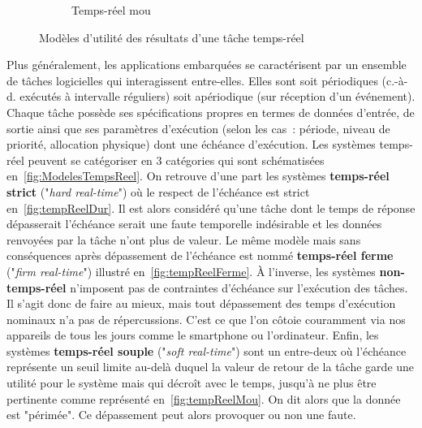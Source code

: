 \documentclass[french, a4paper, 11pt, twoside, pdftex]{StyleThese}
\begin{document}
\begin{figure}[h]
\begin{subfigure}{.3\textwidth}
				\caption[]{Temps-réel mou}
				\label{fig:tempReelMou}
			\end{subfigure}
			\caption{Modèles d'utilité des résultats d'une tâche temps-réel}
			\label{fig:ModelesTempsReel}
		\end{figure}
		
		Plus généralement, les applications embarquées se caractérisent par un ensemble de tâches logicielles qui interagissent entre-elles. Elles sont soit périodiques (c.-à-d. exécutés à intervalle réguliers) soit apériodique (sur réception d'un événement). Chaque tâche possède ses spécifications propres en termes de données d'entrée, de sortie ainsi que ses paramètres d'exécution (selon les cas : période, niveau de priorité, allocation physique) dont une échéance d'exécution. Les systèmes temps-réel peuvent se catégoriser en 3 catégories qui sont schématisées en~\autoref{fig:ModelesTempsReel}. On retrouve d'une part les systèmes \textbf{temps-réel strict} ("\textit{hard real-time}") où le respect de l'échéance est strict en~\autoref{fig:tempReelDur}. Il est alors considéré qu'une tâche dont le temps de réponse dépasserait l'échéance serait une faute temporelle indésirable et les données renvoyées par la tâche n'ont plus de valeur. Le même modèle mais sans conséquences après dépassement de l'échéance est nommé \textbf{temps-réel ferme} ("\textit{firm real-time}") illustré en~\autoref{fig:tempReelFerme}. À l'inverse, les systèmes \textbf{non-temps-réel} n'imposent pas de contraintes d'échéance sur l'exécution des tâches. Il s'agit donc de faire au mieux, mais tout dépassement des temps d'exécution nominaux n'a pas de répercussions. C'est ce que l'on côtoie couramment via nos appareils de tous les jours comme le smartphone ou l'ordinateur. Enfin, les systèmes \textbf{temps-réel souple} ("\textit{soft real-time}") sont un entre-deux où l'échéance représente un seuil limite au-delà duquel la valeur de retour de la tâche garde une utilité pour le système mais qui décroît avec le temps, jusqu'à ne plus être pertinente comme représenté en~\autoref{fig:tempReelMou}. On dit alors que la donnée est "périmée". Ce dépassement peut alors provoquer ou non une faute.
		
\end{document}
